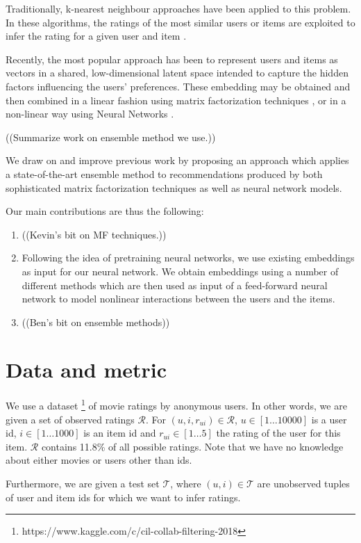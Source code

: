 \documentclass[10pt,conference,compsocconf]{IEEEtran}
\begin{document}
    
Traditionally, k-nearest neighbour approaches have been applied to this problem. In these algorithms, the ratings of the most similar users or items are exploited to infer the rating for a given user and item \cite{sarwar2001item}.

Recently, the most popular approach has been to represent users and items  as vectors in a shared, low-dimensional latent space intended to capture the hidden factors influencing the users' preferences. These embedding may be obtained and then combined in a linear fashion using matrix factorization techniques \cite{koren2009matrix}, or in a non-linear way using Neural Networks
\cite{he2017neural}.


((Summarize work on ensemble method we use.))



We draw on and improve previous work by proposing an approach which applies a state-of-the-art ensemble method to recommendations produced by both sophisticated matrix factorization techniques as well as neural network models.

Our main contributions are thus the following: 
\begin{enumerate}
    \item ((Kevin's bit on MF techniques.))
    \item Following the idea of pretraining neural networks, we use existing embeddings as input for our neural network. We obtain embeddings using a number of different methods which are then used as input of a feed-forward neural network to model nonlinear interactions between the users and the items. 
    \item ((Ben's bit on ensemble methods))
\end{enumerate}


\section{Data and metric}
We use a dataset \footnote{https://www.kaggle.com/c/cil-collab-filtering-2018} of movie ratings by anonymous users.
In other words, we are given a set of observed ratings $\mathcal{R}$. For $(u, i, r_{ui}) \in \mathcal{R}$, $u \in [1\dots10000]$ is a user id, $i \in [1\dots1000]$  is an item id and $r_{ui} \in [1\dots5]$ the rating of the user for this item. $\mathcal{R}$ contains 11.8\% of all possible ratings. Note that we have no knowledge about either movies or users other than ids.

Furthermore, we are given a test set $\mathcal{T}$, where $(u,i) \in \mathcal{T}$ are unobserved tuples of user and item ids for which we want to infer ratings.
\end{document}
